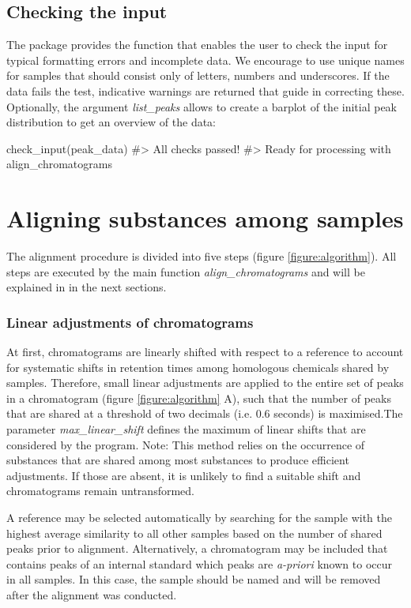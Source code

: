\subsection{Checking the input}
The package provides the function  that enables the user to check the input for typical formatting errors and incomplete data. We encourage to use unique names for samples that should consist only of letters, numbers and underscores. If the data fails the test, indicative warnings are returned that guide in correcting these. Optionally, the argument \textit{list{\_}peaks} allows to create a barplot of the initial peak distribution to get an overview of the data:

\begin{example}
check_input(peak_data)
#> All checks passed!
#> Ready for processing with align_chromatograms
\end{example}

\section{Aligning substances among samples}
The alignment procedure is divided into five steps (figure \ref{figure:algorithm}). All steps are executed by the main function \textit{align{\_}chromatograms} and will be explained in in the next sections.
\subsubsection{Linear adjustments of chromatograms}
At first, chromatograms are linearly shifted with respect to a reference to account for systematic shifts in retention times among homologous chemicals shared by samples. Therefore, small linear adjustments are applied to the entire set of peaks in a chromatogram (figure \ref{figure:algorithm} A), such that the number of peaks that are shared at a threshold of two decimals (i.e. 0.6 seconds) is maximised.The parameter \textit{max{\_}linear{\_}shift} defines the maximum of linear shifts that are considered by the program. \newline
Note: This method relies on the occurrence of substances that are shared among most substances to produce efficient adjustments. If those are absent, it is unlikely to find a suitable shift and chromatograms remain untransformed. \par
A reference may be selected automatically by searching for the sample with the highest average similarity to all other samples based on the number of shared peaks prior to alignment. Alternatively, a chromatogram may be included that contains peaks of an internal standard which peaks are \textit{a-priori} known to occur in all samples. In this case, the sample should be named  and will be removed after the alignment was conducted.

